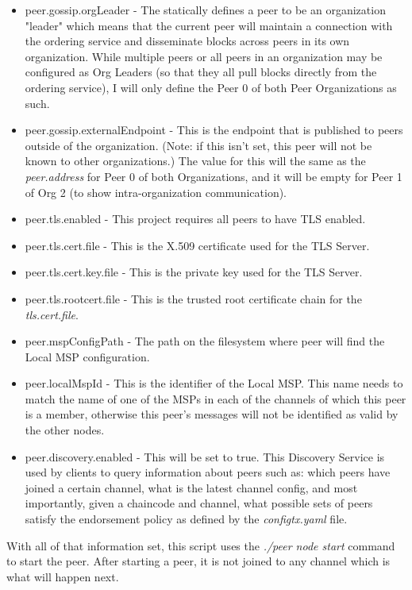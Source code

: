 \begin{itemize}
\begin{itemize}
							\item peer.gossip.orgLeader - The statically defines a peer to be an organization "leader" which means that the current peer will maintain a connection with the ordering service and disseminate blocks across peers in its own organization. While multiple peers or all peers in an organization may be configured as Org Leaders (so that they all pull blocks directly from the ordering service), I will only define the Peer 0 of both Peer Organizations as such.
							\item peer.gossip.externalEndpoint - This is the endpoint that is published to peers outside of the organization. (Note: if this isn't set, this peer will not be known to other organizations.) The value for this will the same as the \textit{peer.address} for Peer 0 of both Organizations, and it will be empty for Peer 1 of Org 2 (to show intra-organization communication).
							\item peer.tls.enabled - This project requires all peers to have TLS enabled.
							\item peer.tls.cert.file - This is the X.509 certificate used for the TLS Server.
							\item peer.tls.cert.key.file - This is the private key used for the TLS Server.
							\item peer.tls.rootcert.file - This is the trusted root certificate chain for the \textit{tls.cert.file}.
							\item peer.mspConfigPath - The path on the filesystem where peer will find the Local MSP configuration.
							\item peer.localMspId - This is the identifier of the Local MSP. This name needs to match the name of one of the MSPs in each of the channels of which this peer is a member, otherwise this peer's messages will not be identified as valid by the other nodes.
							\item peer.discovery.enabled - This will be set to true. This Discovery Service is used by clients to query information about peers such as: which peers have joined a certain channel, what is the latest channel config, and most importantly, given a chaincode and channel, what possible sets of peers satisfy the endorsement policy as defined by the \textit{configtx.yaml} file.
						\end{itemize}
						
					\hspace{10mm}With all of that information set, this script uses the \textit{./peer node start} command to start the peer. After starting a peer, it is not joined to any channel which is what will happen next.
					

\end{itemize}
